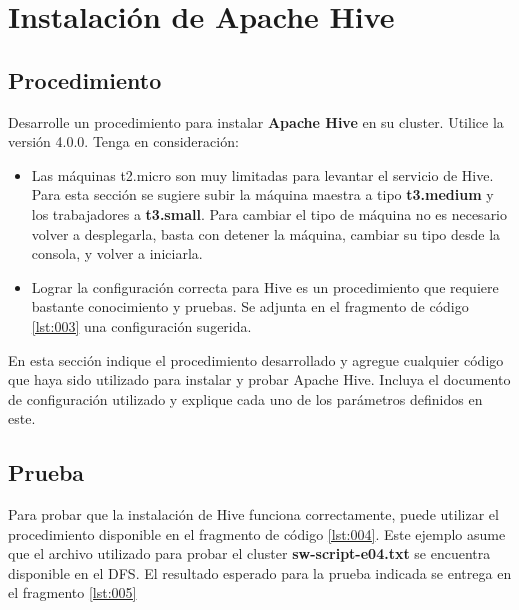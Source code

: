 \documentclass[12pt,letterpaper,twoside]{article}
\begin{document}
\section{Instalación de Apache Hive}

\subsection{Procedimiento}

{\color{red} Desarrolle un procedimiento para instalar \textbf{Apache Hive} en su cluster. Utilice la versión 4.0.0. Tenga en consideración:
\begin{itemize}
    \item Las máquinas t2.micro son muy limitadas para levantar el servicio de Hive. Para esta sección se sugiere subir la máquina maestra a tipo \textbf{t3.medium} y los trabajadores a \textbf{t3.small}. Para cambiar el tipo de máquina no es necesario volver a desplegarla, basta con detener la máquina, cambiar su tipo desde la consola, y volver a iniciarla.
    \item Lograr la configuración correcta para Hive es un procedimiento que requiere bastante conocimiento y pruebas. Se adjunta en el fragmento de código \ref{lst:003} una configuración sugerida.
\end{itemize}}

\begin{code}[H]

\end{code}

{\color{red} En esta sección indique el procedimiento desarrollado y agregue cualquier código que haya sido utilizado para instalar y probar Apache Hive. Incluya el documento de configuración utilizado y explique cada uno de los parámetros definidos en este.}

\subsection{Prueba}

{\color{red} Para probar que la instalación de Hive funciona correctamente, puede utilizar el procedimiento disponible en el fragmento de código \ref{lst:004}. Este ejemplo asume que el archivo utilizado para probar el cluster \textbf{sw-script-e04.txt} se encuentra disponible en el DFS. El resultado esperado para la prueba indicada se entrega en el fragmento \ref{lst:005}}
\end{document}
